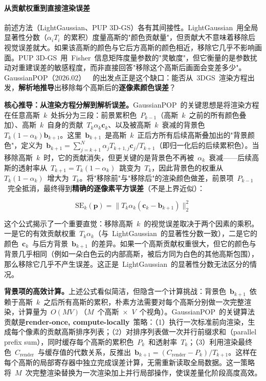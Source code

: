 \paragraph{从贡献权重到直接渲染误差}

前述方法（LightGaussian、PUP 3D-GS）各有其间接性。LightGaussian~用全局显著性分数（$\alpha_i T_i$~的累积）度量高斯的"颜色贡献量"，但贡献大不意味着移除后视觉误差就大。如果该高斯的颜色与它后方高斯的颜色相近，移除它几乎不影响画面。PUP 3D-GS~用~Fisher~信息矩阵度量参数的"灵敏度"，但它衡量的是参数扰动对重建误差的敏感程度，而非直接回答"移除这个高斯后画面会变差多少"。GaussianPOP（2026.02）~\cite{2602_06830}~的出发点正是这个缺口：能否从~3DGS~渲染方程出发，\textbf{解析地推导}出移除每个高斯后的\textbf{逐像素颜色误差}？

\textbf{核心推导：从渲染方程分解到解析误差。}GaussianPOP~的关键思想是将渲染方程在任意高斯~$k$~处拆分为三段：前景累积色~$P_{k-1}$（高斯~$k$~之前的所有颜色叠加）、高斯~$k$~自身的贡献~$T_k \alpha_k \mathbf{c}_k$、以及被高斯~$k$~衰减的背景色~$T_k(1-\alpha_k)\mathbf{b}_{k+1}$。这里~$\mathbf{b}_{k+1}$~是高斯~$k$~正后方所有后续高斯叠加出的"背景颜色"，定义为~$\mathbf{b}_{k+1} = \sum_{j=k+1}^{N} \alpha_j T_{k+1,j} \mathbf{c}_j / T_{k+1}$（即归一化后的后续累积色）。当移除高斯~$k$~时，它的贡献消失，但更关键的是背景色不再被~$\alpha_k$~衰减——后续高斯的透射率从~$T_{k+1} = T_k(1-\alpha_k)$~跳变为~$T_k$，因此背景色的权重从~$T_k(1-\alpha_k)$~增大为~$T_k$。将"移除前"与"移除后"的渲染颜色做差，前景项~$P_{k-1}$~完全抵消，最终得到\textbf{精确的逐像素平方误差}（不是上界近似）：

\begin{equation}
\mathrm{SE}_k(\mathbf{p}) = \| T_k \alpha_k (\mathbf{c}_k - \mathbf{b}_{k+1}) \|_2^2
\end{equation}

这个公式揭示了一个重要直觉：移除高斯~$k$~的视觉误差取决于两个因素的乘积。一是它的有效贡献权重~$T_k \alpha_k$（与~LightGaussian~的显著性分数一致），二是它的颜色~$\mathbf{c}_k$~与后方背景~$\mathbf{b}_{k+1}$~的差异。如果一个高斯贡献权重很大，但它的颜色与背景几乎相同（例如一朵白色云的内部高斯，被后方同为白色的其他高斯包围），那么移除它几乎不产生误差。这正是~LightGaussian~的显著性分数无法区分的情况。

\textbf{背景项的高效计算。}上述公式看似简洁，但隐含一个计算挑战：背景色~$\mathbf{b}_{k+1}$~依赖于高斯~$k$~之后所有高斯的累积，朴素方法需要对每个高斯分别做一次完整渲染，计算量为~$O(MV)$（$M$~个高斯~$\times$~$V$~个视角）。GaussianPOP~的关键算法贡献是\textbf{render-once, compute-locally}~策略：（1）执行一次标准前向渲染，生成每个像素的贡献高斯排序列表；（2）对排序列表做一次并行前缀求和（parallel prefix sum），同时缓存每个高斯的累积色~$P_k$~和透射率~$T_k$；（3）利用渲染最终色~$C_{\mathrm{render}}$~与缓存值的代数关系，反推出~$\mathbf{b}_{k+1} = (C_{\mathrm{render}} - P_k) / T_{k+1}$。这样在每个高斯的局部寄存器中独立完成误差计算，无需重新读取全局数据。这一策略将~$M$~次完整渲染替换为一次渲染加上并行局部操作，使误差量化阶段高度高效。

